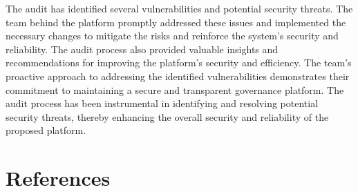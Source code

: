 \documentclass[11pt]{article}
\begin{document}
The audit has identified several vulnerabilities and potential security threats.
The team behind the platform promptly addressed these issues and implemented the necessary changes to mitigate the risks and reinforce the system's security and reliability.
The audit process also provided valuable insights and recommendations for improving the platform's security and efficiency.
The team's proactive approach to addressing the identified vulnerabilities demonstrates their commitment to maintaining a secure and transparent governance platform.
The audit process has been instrumental in identifying and resolving potential security threats, thereby enhancing the overall security and reliability of the proposed platform.

\section{References}

\printbibliography
\end{document}
